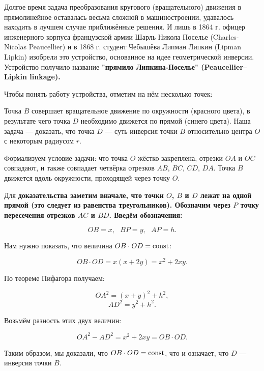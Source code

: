 Долгое время задача преобразования кругового (вращательного) движения в прямолинейное оставалась весьма сложной в машиностроении, удавалось находить в лучшем случае приближённые решения. И лишь в 1864 г. офицер инженерного корпуса французской армии Шарль Никола Поселье (Charles-Nicolas Peaucellier) и в 1868 г. студент Чебышёва Липман Липкин (Lipman Lipkin) изобрели это устройство, основанное на идее геометрической инверсии. Устройство получило название \bf{"прямило Липкина-Поселье"} (Peaucellier–Lipkin linkage).


Чтобы понять работу устройства, отметим на нём несколько точек:


Точка $B$ совершает вращательное движение по окружности (красного цвета), в результате чего точка $D$ необходимо движется по прямой (синего цвета). Наша задача --- доказать, что точка $D$ --- суть инверсия точки $B$ относительно центра $O$ с некоторым радиусом $r$.

Формализуем условие задачи: что точка $O$ жёстко закреплена, отрезки $OA$ и $OC$ совпадают, и также совпадает четвёрка отрезков $AB$, $BC$, $CD$, $DA$. Точка $B$ движется вдоль окружности, проходящей через точку $O$.

Для \bf{доказательства} заметим вначале, что точки $O$, $B$ и $D$ лежат на одной прямой (это следует из равенства треугольников). Обозначим через $P$ точку пересечения отрезков $AC$ и $BD$. Введём обозначения:

$$ OB=x,~~~BP=y,~~~AP=h. $$

Нам нужно показать, что величина $OB \cdot OD = {\rm const}$:

$$ OB \cdot OD = x(x+2y) = x^2 + 2xy. $$

По теореме Пифагора получаем:

$$ OA^2 = (x+y)^2 + h^2, $$
$$ AD^2 = y^2 + h^2. $$

Возьмём разность этих двух величин:

$$ OA^2 - AD^2 = x^2 + 2xy = OB \cdot OD. $$

Таким образом, мы доказали, что $OB \cdot OD = {\rm const}$, что и означает, что $D$ --- инверсия точки $B$.

